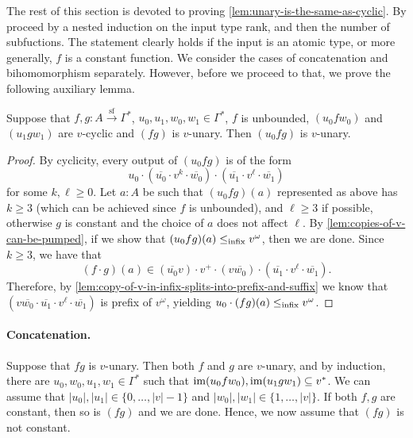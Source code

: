 The rest of this section is devoted to proving \cref{lem:unary-is-the-same-as-cyclic}. By proceed by a nested induction on the input type rank, and then the number of subfuctions. The statement clearly holds if the input is an atomic type, or more generally, $f$ is a constant function. We consider the cases of concatenation and bihomomorphism separately. However, before we proceed to that, we prove the following auxiliary lemma.

\begin{lemma}\label{lem:unarity-you-can-attach-prefix-to-unbounded}
    Suppose that $f,g : A \xrightarrow{\mathrm{sf}} \Gamma^*$, $u_0,u_1,w_0,w_1 \in \Gamma^*$, $f$ is unbounded, $(u_0 f w_0)$ and $(u_1 g w_1)$ are $v$-cyclic and $(f g)$ is $v$-unary. Then $(u_0 f g)$ is $v$-unary.
\end{lemma}

\begin{proof}
    By cyclicity, every output of $(u_0 f g)$ is of the form 
    \[
        u_0 \cdot (\overline{u_0} \cdot v^k \cdot \overline{w_0}) \cdot (\overline{u_1} \cdot v^\ell \cdot \overline{w_1})
    \]
    for some $k, \ell \geq 0$. Let $a : A$ be such that $(u_0 f g)(a)$ represented as above has $k \geq 3$ (which can be achieved since $f$ is unbounded), and $\ell \geq 3$ if possible, otherwise $g$ is constant and the choice of $a$ does not affect $\ell$. By \cref{lem:copies-of-v-can-be-pumped}, if we show that $(u_0 f g)(a) \leq_{\mathrm{infix}} v^\omega$, then we are done. Since $k \geq 3$, we have that 
    \[
        (f \cdot g)(a) \in (\overline{u_0} v) \cdot v^+ \cdot (v \overline{w_0}) \cdot (\overline{u_1} \cdot v^\ell \cdot \overline{w_1}).
    \]
    Therefore, by \cref{lem:copy-of-v-in-infix-splits-into-prefix-and-suffix} we know that $(v \overline{w_0} \cdot \overline{u_1} \cdot v^\ell \cdot \overline{w_1})$ is prefix of $v^\omega$, yielding $u_0 \cdot (fg)(a) \leq_{\mathrm{infix}} v^\omega$.
\end{proof}

\paragraph{Concatenation.} Suppose that $f g$ is $v$-unary. Then both $f$ and $g$ are $v$-unary, and by induction, there are $u_0,w_0,u_1,w_1 \in \Gamma^*$ such that $\operatorname{\mathrm{im}}(u_0 f w_0), \operatorname{\mathrm{im}}(u_1 g w_1) \subseteq v^*$. We can assume that $|u_0|, |u_1| \in \{0, \dots, |v|-1\}$ and $|w_0|, |w_1| \in \{1, \dots, |v| \}$. If both $f,g$ are constant, then so is $(f g)$ and we are done. Hence, we now assume that $(f g)$ is not constant. 

